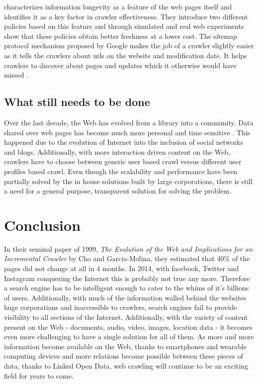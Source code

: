 \documentclass[a4paper, 11pt]{article} %
\begin{document}
\cite{olston2008recrawl} characterizes information longevity as a feature of the web pages itself and identifies it as a key factor in crawler effectiveness. They introduce two different policies based on this feature and through simulated and real web experiments show that these policies obtain better freshness at a lower cost. The sitemap protocol mechanism proposed by Google makes the job of a crawler slightly easier as it tells the crawlers about urls on the website and modification date. It helps crawlers to discover about pages and updates which it otherwise would have missed \cite{google2014sitemap}. 

\subsection{What still needs to be done}

Over the last decade, the Web has evolved from a library into a community. Data shared over web pages has become much more personal and time sensitive \cite{cho2010dealing}. This happened due to the evolution of Internet into the inclusion of social networks and blogs. Additionally, with more interaction driven content on the Web, crawlers have to choose between generic user based crawl versus different user profiles based crawl. Even though the scalability and performance have been partially solved by the in house solutions built by large corporations, there is still a need for a general purpose, transparent solution for solving the problem.

\section{Conclusion}

In their seminal paper of 1999, \textit{The Evolution of the Web and Implications for an Incremental Crawler} by Cho and Garcia-Molina, they estimated that 40\% of the pages did not change at all in 4 months. In 2014, with facebook, Twitter and Instagram conquering the Internet this is probably not true any more. Therefore a search engine has to be intelligent enough to cater to the whims of it's billions of users. Additionally, with much of the information walled behind the websites huge corporations and inaccessible to crawlers, search engines fail to provide visibility to all sections of the Internet. Additionally, with the variety of content present on the Web - documents, audio, video, images, location data - it becomes even more challenging to have a single solution for all of them. As more and more information become available on the Web, thanks to smartphones and wearable computing devices and more relations become possible between these pieces of data, thanks to Linked Open Data, web crawling will continue to be an exciting field for years to come.
\end{document}
